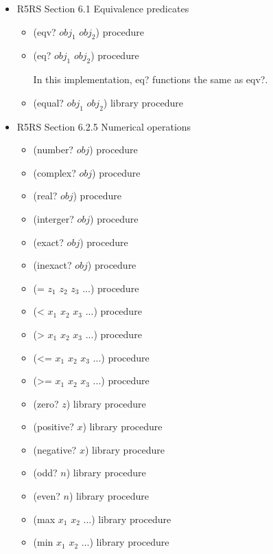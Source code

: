 \documentclass{article}
\begin{document}
\begin{itemize}

\item R5RS Section 6.1 Equivalence predicates
	\begin{itemize}
		\item (eqv? $obj_1$ $obj_2$)	\hfill	procedure		
		
		\item (eq? $obj_1$ $obj_2$)	\hfill procedure
		
		In this implementation, eq? functions the same as eqv?.
		
		\item (equal? $obj_1$ $obj_2$)	\hfill library procedure
	\end{itemize}

\item R5RS Section 6.2.5 Numerical operations
	\begin{itemize}
		\item (number? $obj$)	\hfill	procedure
		\item (complex? $obj$)	\hfill	procedure
		\item (real? $obj$)	\hfill	procedure
		\item (interger? $obj$)	\hfill	procedure
		
		\item (exact? $obj$)	\hfill	procedure
		\item (inexact? $obj$)	\hfill	procedure
		
		\item (= $z_1$ $z_2$ $z_3$ ...)	\hfill	procedure
		\item (< $x_1$ $x_2$ $x_3$ ...)	\hfill	procedure
		\item (> $x_1$ $x_2$ $x_3$ ...)	\hfill	procedure
		\item (<= $x_1$ $x_2$ $x_3$ ...)	\hfill	procedure
		\item (>= $x_1$ $x_2$ $x_3$ ...)	\hfill	procedure
		
		\item (zero? $z$)	\hfill	library procedure
		\item (positive? $x$)	\hfill	library procedure
		\item (negative? $x$)	\hfill library procedure
		\item (odd? $n$)	\hfill library procedure
		\item (even? $n$)	\hfill library procedure
		
		\item (max $x_1$ $x_2$ ...)	\hfill	library procedure
		\item (min $x_1$ $x_2$ ...)	\hfill	library procedure
		

\end{itemize}
\end{itemize}
\end{document}
